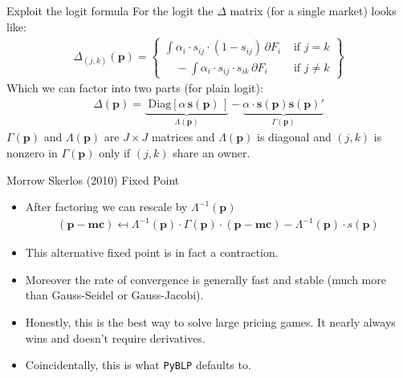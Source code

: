 \begin{frame}{Exploit the logit formula}
For the logit the $\Delta$ matrix (for a single market) looks like:
\begin{align*}
\Delta_{(j,k)}(\mathbf{p}) = \left\{\begin{array}{lr}
       \int \alpha_i \cdot s_{ij}\cdot (1-s_{ij}) \, \partial F_i& \text{ if } j=k \\
       	  \quad -\int \alpha_i \cdot s_{ij} \cdot s_{ik} \, \partial F_i &  \text{ if }  j\neq k 
        \end{array} \right\}
\end{align*}
Which we can factor into two parts (for plain logit):
\begin{align*}
\Delta(\mathbf{p}) =  \underbrace{\text{ Diag}\left[ \alpha \, \mathbf{s}(\mathbf{p}) \, \right]}_{\Lambda(\mathbf{p})} -  \underbrace{\alpha \cdot \mathbf{s}(\mathbf{p}) \mathbf{s}(\mathbf{p})'}_{\Gamma(\mathbf{p})}
\end{align*}
$\Gamma(\mathbf{p})$ and $\Lambda(\mathbf{p})$ are $J \times J$ matrices and $\Lambda(\mathbf{p})$ is diagonal and $(j,k)$ is nonzero in $\Gamma(\mathbf{p})$ only if $(j,k)$ share an owner.
\end{frame}


\begin{frame}{Morrow Skerlos (2010) Fixed Point}
\begin{itemize}
\item After factoring we can rescale by $\Lambda^{-1} (\mathbf{p})$
\begin{align*}
(\mathbf{p}-\mathbf{mc} ) \mapsfrom \Lambda^{-1}(\mathbf{p}) \cdot \Gamma(\mathbf{p})\cdot(\mathbf{p}- \mathbf{mc}) - \Lambda^{-1}(\mathbf{p})\cdot s(\mathbf{p})
\end{align*}
\item This alternative fixed point is in fact a contraction.
\item Moreover the rate of convergence is generally fast and stable (much more than Gauss-Seidel or Gauss-Jacobi).
\item Honestly, this is the best way to solve large pricing games. It nearly always wins and doesn't require derivatives.
\item Coincidentally, this is what \texttt{PyBLP} defaults to.
\end{itemize}
\end{frame}



